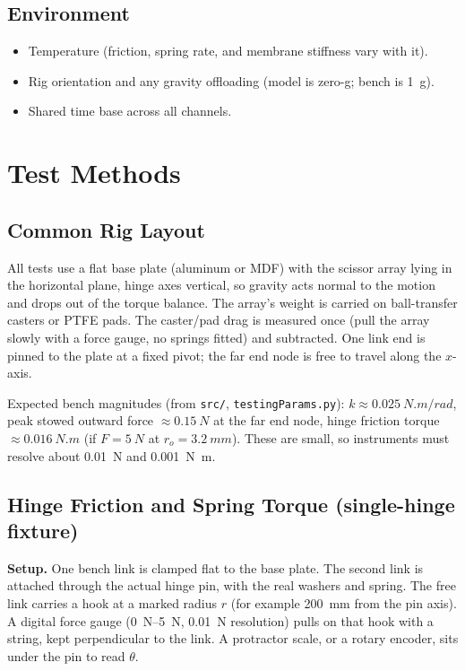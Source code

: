 \documentclass[11pt]{article}
\begin{document}
\subsection{Environment}
\begin{itemize}[noitemsep]
    \item Temperature (friction, spring rate, and membrane stiffness vary with it).
    \item Rig orientation and any gravity offloading (model is zero-g; bench is \SI{1}{g}).
    \item Shared time base across all channels.
\end{itemize}

\section{Test Methods}

\subsection{Common Rig Layout}

All tests use a flat base plate (aluminum or MDF) with the scissor array lying in the horizontal
plane, hinge axes vertical, so gravity acts normal to the motion and drops out of the torque balance.
The array's weight is carried on ball-transfer casters or PTFE pads. The caster/pad drag is measured
once (pull the array slowly with a force gauge, no springs fitted) and subtracted. One link end is
pinned to the plate at a fixed pivot; the far end node is free to travel along the $x$-axis.

Expected bench magnitudes (from \texttt{src/}, \texttt{testingParams.py}): $k\approx\SI{0.025}{N.m/rad}$,
peak stowed outward force $\approx\SI{0.15}{N}$ at the far end node, hinge friction torque
$\approx\SI{0.016}{N.m}$ (if $F=\SI{5}{N}$ at $r_o=\SI{3.2}{mm}$). These are small, so instruments must
resolve about \SI{0.01}{N} and \SI{0.001}{N.m}.

\subsection{Hinge Friction and Spring Torque (single-hinge fixture)}

\textbf{Setup.} One bench link is clamped flat to the base plate. The second link is attached through
the actual hinge pin, with the real washers and spring. The free link carries a hook at a marked
radius $r$ (for example \SI{200}{mm} from the pin axis). A digital force gauge (\SIrange{0}{5}{N},
\SI{0.01}{N} resolution) pulls on that hook with a string, kept perpendicular to the link. A
protractor scale, or a rotary encoder, sits under the pin to read $\theta$.
\end{document}
